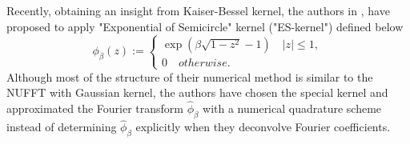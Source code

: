 Recently, obtaining an insight from Kaiser-Bessel kernel, the authors in \cite{SISC-2019-Barnett}, \cite{IEEE-2021-Barnett} have proposed to apply "Exponential of Semicircle" kernel ("ES-kernel") defined below
\begin{equation}
  \phi_{\beta}(z) :=
  \begin{cases}
    \exp\left(\beta\sqrt{1-z^2} - 1\right) \quad |z| \le 1,\\
    0 \quad otherwise.
  \end{cases}
  \label{eq:ES-kernel}
\end{equation}
Although most of the structure of their numerical method is similar to the NUFFT with Gaussian kernel, the authors have chosen the special kernel and approximated the Fourier transform $\hat{\phi}_{\beta}$ with a numerical quadrature scheme instead of determining $\hat{\phi}_{\beta}$ explicitly when they deconvolve Fourier coefficients.

